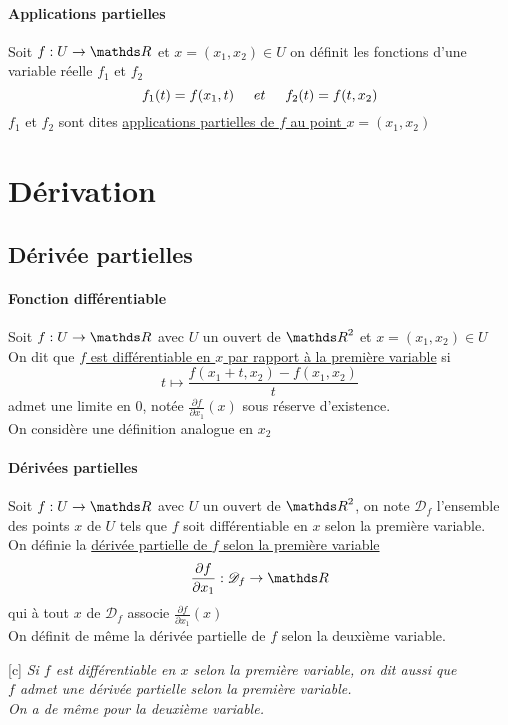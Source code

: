 		\paragraph{Applications partielles}
			Soit $f : U\to \R$ et $x=(x_1,x_2)\in U$ on définit les fonctions d'une variable réelle $f_1$ et $f_2$ 
			\[ f_1(t) = f(x_1,t) \hspace*{0.5cm} et \hspace*{0.5cm} f_2(t) = f(t,x_2)\] $f_1$ et $f_2$ sont dites \uline{applications partielles de $f$ au point $x=(x_1,x_2)$} \trait
	\section{Dérivation}
	\subsection{Dérivée partielles}
		\traitd
		\paragraph{Fonction différentiable}
			Soit $f:U \to \R$ avec $U$ un ouvert de $\R^2$ et $x=(x_1,x_2)\in U$\\
			On dit que \uline{$f$ est différentiable en $x$ par rapport à la première variable} si \[ t \mapsto \frac{f(x_1+t,x_2)-f(x_1,x_2)}{t}\] admet une limite en $0$, notée $\frac{\partial f}{\partial x_1} (x)$ sous réserve d'existence. \vspace*{0.2cm} \\ On considère une définition analogue en $x_2$
			\trait ${}$ \vspace*{-1.2cm} \traitd
		\paragraph{Dérivées partielles}
			Soit $f:U\to \R$ avec $U$ un ouvert de $\R^2$, on note $\mathscr{D}_f$ l'ensemble des points $x$ de $U$ tels que $f$ soit différentiable en $x$ selon la première variable.\\ On définie la \uline{dérivée partielle de $f$ selon la première variable} \[ \frac{\partial f}{\partial x_1} : \mathscr{D}_f \to \R \] qui à tout $x$ de $\mathscr{D}_f$ associe $\frac{\partial f}{\partial x_1}(x)$\vspace*{0.2cm} \\
			On définit de même la dérivée partielle de $f$ selon la deuxième variable. \trait \vspace*{-1.4cm} \\ 
		\begin{center} \begin{blockarray}{[c]}
		\textit{Si $f$ est différentiable en $x$ selon la première variable, on dit aussi que} \\ \textit{$f$ admet une dérivée partielle selon la première variable.}\\
		\textit{On a de même pour la deuxième variable.}
		\end{blockarray} \end{center}  ${}$\traitd
